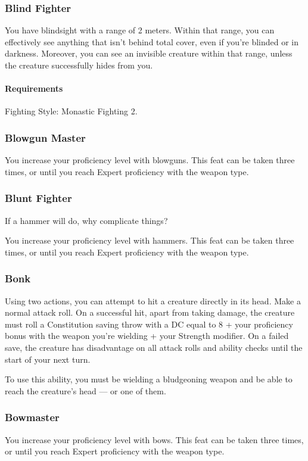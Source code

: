 \subsubsection{Blind Fighter} \label{feat::blindfighter}
    You have blindsight with a range of 2 meters.
    Within that range, you can effectively see anything that isn't behind total cover, even if you're blinded or in darkness.
    Moreover, you can see an invisible creature within that range, unless the creature successfully hides from you.
    \paragraph{Requirements} Fighting Style: Monastic Fighting 2.
\subsubsection{Blowgun Master} \label{feat::blowgunmaster}
    You increase your proficiency level with blowguns.
    This feat can be taken three times, or until you reach Expert proficiency with the weapon type.
\subsubsection{Blunt Fighter} \label{feat::bluntfighter}
    If a hammer will do, why complicate things?

    You increase your proficiency level with hammers.
    This feat can be taken three times, or until you reach Expert proficiency with the weapon type.
\subsubsection{Bonk} \label{feat::bonk}
    Using two actions, you can attempt to hit a creature directly in its head.
    Make a normal attack roll.
    On a successful hit, apart from taking damage, the creature must roll a Constitution saving throw with a DC equal to 8 + your proficiency bonus with the weapon you're wielding + your Strength modifier.
    On a failed save, the creature has disadvantage on all attack rolls and ability checks until the start of your next turn.

    To use this ability, you must be wielding a bludgeoning weapon and be able to reach the creature's head --- or one of them.
\subsubsection{Bowmaster} \label{feat::bowmaster}
    You increase your proficiency level with bows.
    This feat can be taken three times, or until you reach Expert proficiency with the weapon type.
